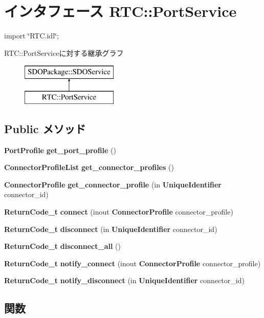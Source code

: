 \section{インタフェース RTC::PortService}
\label{interfaceRTC_1_1PortService}


{\ttfamily import \char`\"{}RTC.idl\char`\"{};}

RTC::PortServiceに対する継承グラフ\begin{figure}[H]
\begin{center}
\leavevmode
\includegraphics[height=2cm]{interfaceRTC_1_1PortService}
\end{center}
\end{figure}
\subsection*{Public メソッド}
\begin{DoxyCompactItemize}
\item 
{\bf PortProfile} {\bf get\_\-port\_\-profile} ()
\item 
{\bf ConnectorProfileList} {\bf get\_\-connector\_\-profiles} ()
\item 
{\bf ConnectorProfile} {\bf get\_\-connector\_\-profile} (in {\bf UniqueIdentifier} connector\_\-id)
\item 
{\bf ReturnCode\_\-t} {\bf connect} (inout {\bf ConnectorProfile} connector\_\-profile)
\item 
{\bf ReturnCode\_\-t} {\bf disconnect} (in {\bf UniqueIdentifier} connector\_\-id)
\item 
{\bf ReturnCode\_\-t} {\bf disconnect\_\-all} ()
\item 
{\bf ReturnCode\_\-t} {\bf notify\_\-connect} (inout {\bf ConnectorProfile} connector\_\-profile)
\item 
{\bf ReturnCode\_\-t} {\bf notify\_\-disconnect} (in {\bf UniqueIdentifier} connector\_\-id)
\end{DoxyCompactItemize}


\subsection{関数}

